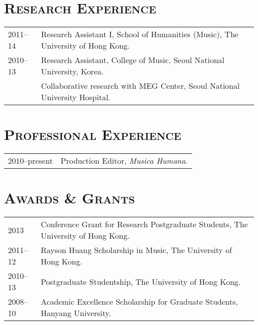 \documentclass[a4paper,11pt]{article}
\begin{document}
  \vspace{2.5mm}
  
  \section*{\textsc{Research Experience}}
  
  \hspace*{-0.25cm}
  \begin{tabular}{p{2.5cm} l}
    2011--14 & Research Assistant I, School of Humanities (Music), The University of Hong Kong.\\
    
    2010--13 & Research Assistant, College of Music, Seoul National University, Korea.\\
    & Collaborative research with MEG Center, Seoul National University Hospital.
  \end{tabular}
  
  \vspace*{2.5mm}
  
  \section*{\textsc{Professional Experience}}
  
  \hspace*{-0.25cm}
  \begin{tabular}{p{2.5cm} l}
    2010--present & Production Editor, \textit{Musica Humana}.
  \end{tabular}
  
  \vspace{2.5mm}
  
  \section*{\textsc{Awards \& Grants}}
  
  \hspace*{-0.25cm}
  \begin{tabular}{p{2.5cm} l}
    2013 & Conference Grant for Research Postgraduate Students, The University of Hong Kong.\\
    2011–12 & Rayson Huang Scholarship in Music, The University of Hong Kong.\\
    2010–13 & Postgraduate Studentship, The University of Hong Kong.\\
    2008–10 & Academic Excellence Scholarship for Graduate Students, Hanyang University.
  \end{tabular}
  
\end{document}

